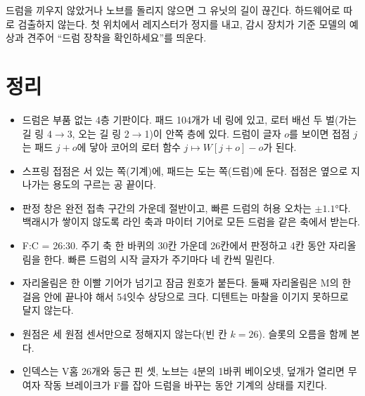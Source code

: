 드럼을 끼우지 않았거나 노브를 돌리지 않으면 그 유닛의 길이 끊긴다. 하드웨어로 따로 검출하지 않는다. 첫 위치에서
레지스터가 정지를 내고, 감시 장치가 기준 모델의 예상과 견주어 ``드럼 장착을 확인하세요''를 띄운다.

\section{정리}

\begin{itemize}
\item 드럼은 부품 없는 4층 기판이다. 패드 104개가 네 링에 있고, 로터 배선 두 벌(가는 길 링 4$\to$3, 오는 길 링 2$\to$1)이
안쪽 층에 있다. 드럼이 글자 $o$를 보이면 접점 $j$는 패드 $j+o$에 닿아 코어의 로터 함수 $j \mapsto W[j+o]-o$가 된다.
\item 스프링 접점은 서 있는 쪽(기계)에, 패드는 도는 쪽(드럼)에 둔다. 접점은 옆으로 지나가는 용도의 구르는 공 끝이다.
\item 판정 창은 완전 접촉 구간의 가운데 절반이고, 빠른 드럼의 허용 오차는 $\pm1.1°$다. 백래시가 쌓이지 않도록 라인
축과 마이터 기어로 모든 드럼을 같은 축에서 받는다.
\item F:C = 26:30. 주기 축 한 바퀴의 30칸 가운데 26칸에서 판정하고 4칸 동안 자리올림을 한다. 빠른 드럼의 시작 글자가
주기마다 네 칸씩 밀린다.
\item 자리올림은 한 이빨 기어가 넘기고 잠금 원호가 붙든다. 둘째 자리올림은 M의 한 걸음 안에 끝나야 해서 54잇수 상당으로
크다. 디텐트는 마찰을 이기지 못하므로 달지 않는다.
\item 원점은 세 원점 센서만으로 정해지지 않는다(빈 칸 $k = 26$).  슬롯의 오름을 함께 본다.
\item 인덱스는 V홈 26개와 둥근 핀 셋, 노브는 4분의 1바퀴 베이오넷, 덮개가 열리면 무여자 작동 브레이크가 F를 잡아 드럼을
바꾸는 동안 기계의 상태를 지킨다.
\end{itemize}
